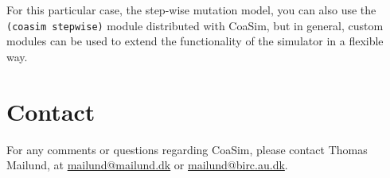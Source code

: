 \documentclass{manual}
\begin{document}
\begin{empfile}
For this particular case, the step-wise mutation model, you can also
use the \texttt{(coasim stepwise)} module distributed with CoaSim, but
in general, custom modules can be used to extend the functionality of
the simulator in a flexible way.

\section{Contact}
\label{sec:contact}

For any comments or questions regarding CoaSim, please contact Thomas
Mailund, at \href{mailto:mailund@mailund.dk}{mailund@mailund.dk} or
\href{mailund@birc.au.dk}{mailund@birc.au.dk}.


\end{empfile}
\end{document}
